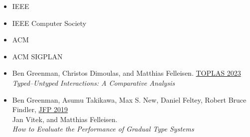 \documentclass[11pt]{article}
\begin{document}


% 



\begin{itemize}
  \item {IEEE} \hfill {}
  \item {IEEE Computer Society} \hfill {}
  \item {ACM} \hfill {}
  \item {ACM SIGPLAN} \hfill {}
\end{itemize}


\begin{itemize}
\item
  Ben Greenman, Christos Dimoulas, and Matthias Felleisen. \hfill \href{https://dl.acm.org/doi/10.1145/3579833}{TOPLAS 2023} \\
  \emph{Typed--Untyped Interactions: A Comparative Analysis}
\item
  Ben Greenman, Asumu Takikawa, Max S. New, Daniel Feltey, Robert Bruce Findler, \hfill \href{https://www.cambridge.org/core/journals/journal-of-functional-programming/article/abs/how-to-evaluate-the-performance-of-gradual-type-systems/DC765724C52A3A462F16C7FB3AD18697}{JFP 2019} \\
  Jan Vitek, and Matthias Felleisen. \\
  \emph{How to Evaluate the Performance of Gradual Type Systems}
\end{itemize}
\end{document}
